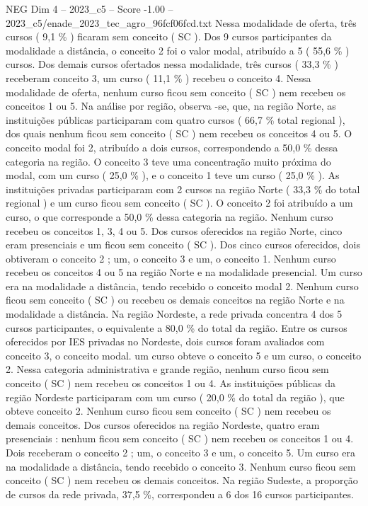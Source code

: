 \begin{textsample}{NEG Dim 4 – 2023\_c5 – Score -1.00 – 2023\_c5/enade\_2023\_tec\_agro\_96fcf06fcd.txt}
Nessa modalidade de oferta, três cursos ( 9,1 \% ) ficaram sem conceito ( SC ).
Dos 9 cursos participantes da modalidade a distância, o conceito 2 foi o valor modal, atribuído a 5 ( 55,6 \% ) cursos.
Dos demais cursos ofertados nessa modalidade, três cursos ( 33,3 \% ) receberam conceito 3, um curso ( 11,1 \% ) recebeu o conceito 4.
Nessa modalidade de oferta, nenhum curso ficou sem conceito ( SC ) nem recebeu os conceitos 1 ou 5.
Na análise por região, observa -se, que, na região Norte, as instituições públicas participaram com quatro cursos ( 66,7 \% total regional ), dos quais nenhum ficou sem conceito ( SC ) nem recebeu os conceitos 4 ou 5.
O conceito modal foi 2, atribuído a dois cursos, correspondendo a 50,0 \% dessa categoria na região.
O conceito 3 teve uma concentração muito próxima do modal, com um curso ( 25,0 \% ), e o conceito 1 teve um curso ( 25,0 \% ).
As instituições privadas participaram com 2 cursos na região Norte ( 33,3 \% do total regional ) e um curso ficou sem conceito ( SC ).
O conceito 2 foi atribuído a um curso, o que corresponde a 50,0 \% dessa categoria na região.
Nenhum curso recebeu os conceitos 1, 3, 4 ou 5.
Dos cursos oferecidos na região Norte, cinco eram presenciais e um ficou sem conceito ( SC ).
Dos cinco cursos oferecidos, dois obtiveram o conceito 2 ; um, o conceito 3 e um, o conceito 1.
Nenhum curso recebeu os conceitos 4 ou 5 na região Norte e na modalidade presencial.
Um curso era na modalidade a distância, tendo recebido o conceito modal 2.
Nenhum curso ficou sem conceito ( SC ) ou recebeu os demais conceitos na região Norte e na modalidade a distância.
Na região Nordeste, a rede privada concentra 4 dos 5 cursos participantes, o equivalente a 80,0 \% do total da região.
Entre os cursos oferecidos por IES privadas no Nordeste, dois cursos foram avaliados com conceito 3, o conceito modal. um curso obteve o conceito 5 e um curso, o conceito 2.
Nessa categoria administrativa e grande região, nenhum curso ficou sem conceito ( SC ) nem recebeu os conceitos 1 ou 4.
As instituições públicas da região Nordeste participaram com um curso ( 20,0 \% do total da região ), que obteve conceito 2.
Nenhum curso ficou sem conceito ( SC ) nem recebeu os demais conceitos.
Dos cursos oferecidos na região Nordeste, quatro eram presenciais : nenhum ficou sem conceito ( SC ) nem recebeu os conceitos 1 ou 4.
Dois receberam o conceito 2 ; um, o conceito 3 e um, o conceito 5.
Um curso era na modalidade a distância, tendo recebido o conceito 3.
Nenhum curso ficou sem conceito ( SC ) nem recebeu os demais conceitos.
Na região Sudeste, a proporção de cursos da rede privada, 37,5 \%, correspondeu a 6 dos 16 cursos participantes.

\end{textsample}
